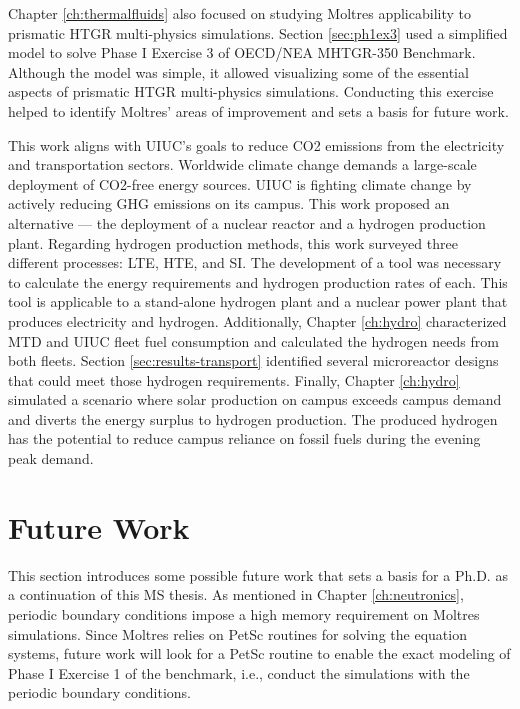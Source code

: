 Chapter \ref{ch:thermalfluids} also focused on studying Moltres applicability to prismatic HTGR multi-physics simulations.
Section \ref{sec:ph1ex3} used a simplified model to solve Phase I Exercise 3 of OECD/NEA MHTGR-350 Benchmark.
Although the model was simple, it allowed visualizing some of the essential aspects of prismatic HTGR multi-physics simulations.
Conducting this exercise helped to identify Moltres' areas of improvement and sets a basis for future work.

This work aligns with UIUC's goals to reduce \gls{CO2} emissions from the electricity and transportation sectors.
Worldwide climate change demands a large-scale deployment of \gls{CO2}-free energy sources.
UIUC is fighting climate change by actively reducing GHG emissions on its campus.
This work proposed an alternative --- the deployment of a nuclear reactor and a hydrogen production plant.
Regarding hydrogen production methods, this work surveyed three different processes: LTE, HTE, and SI.
The development of a tool was necessary to calculate the energy requirements and hydrogen production rates of each.
This tool is applicable to a stand-alone hydrogen plant and a nuclear power plant that produces electricity and hydrogen.
Additionally, Chapter \ref{ch:hydro} characterized MTD and UIUC fleet fuel consumption and calculated the hydrogen needs from both fleets.
Section \ref{sec:results-transport} identified several microreactor designs that could meet those hydrogen requirements.
Finally, Chapter \ref{ch:hydro} simulated a scenario where solar production on campus exceeds campus demand and diverts the energy surplus to hydrogen production.
The produced hydrogen has the potential to reduce campus reliance on fossil fuels during the evening peak demand.

\section{Future Work}
\label{sec:futwork}

This section introduces some possible future work that sets a basis for a Ph.D. as a continuation of this MS thesis.
As mentioned in Chapter \ref{ch:neutronics}, periodic boundary conditions impose a high memory requirement on Moltres simulations.
Since Moltres relies on PetSc routines for solving the equation systems, future work will look for a PetSc routine to enable the exact modeling of Phase I Exercise 1 of the benchmark, i.e., conduct the simulations with the periodic boundary conditions.

